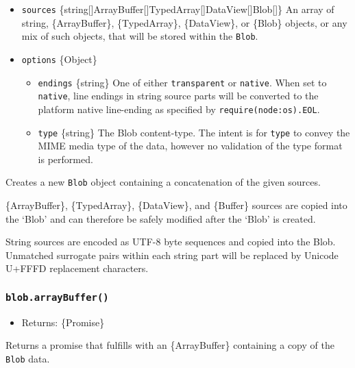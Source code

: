 \begin{itemize}
\tightlist
\item
  \texttt{sources}
  \{string{[}{]}\textbar ArrayBuffer{[}{]}\textbar TypedArray{[}{]}\textbar DataView{[}{]}\textbar Blob{[}{]}\}
  An array of string, \{ArrayBuffer\}, \{TypedArray\}, \{DataView\}, or
  \{Blob\} objects, or any mix of such objects, that will be stored
  within the \texttt{Blob}.
\item
  \texttt{options} \{Object\}

  \begin{itemize}
  \tightlist
  \item
    \texttt{endings} \{string\} One of either
    \texttt{\textquotesingle{}transparent\textquotesingle{}} or
    \texttt{\textquotesingle{}native\textquotesingle{}}. When set to
    \texttt{\textquotesingle{}native\textquotesingle{}}, line endings in
    string source parts will be converted to the platform native
    line-ending as specified by
    \texttt{require(\textquotesingle{}node:os\textquotesingle{}).EOL}.
  \item
    \texttt{type} \{string\} The Blob content-type. The intent is for
    \texttt{type} to convey the MIME media type of the data, however no
    validation of the type format is performed.
  \end{itemize}
\end{itemize}

Creates a new \texttt{Blob} object containing a concatenation of the
given sources.

\{ArrayBuffer\}, \{TypedArray\}, \{DataView\}, and \{Buffer\} sources
are copied into the `Blob' and can therefore be safely modified after
the `Blob' is created.

String sources are encoded as UTF-8 byte sequences and copied into the
Blob. Unmatched surrogate pairs within each string part will be replaced
by Unicode U+FFFD replacement characters.

\subsubsection{\texorpdfstring{\texttt{blob.arrayBuffer()}}{blob.arrayBuffer()}}\label{blob.arraybuffer}

\begin{itemize}
\tightlist
\item
  Returns: \{Promise\}
\end{itemize}

Returns a promise that fulfills with an \{ArrayBuffer\} containing a
copy of the \texttt{Blob} data.

